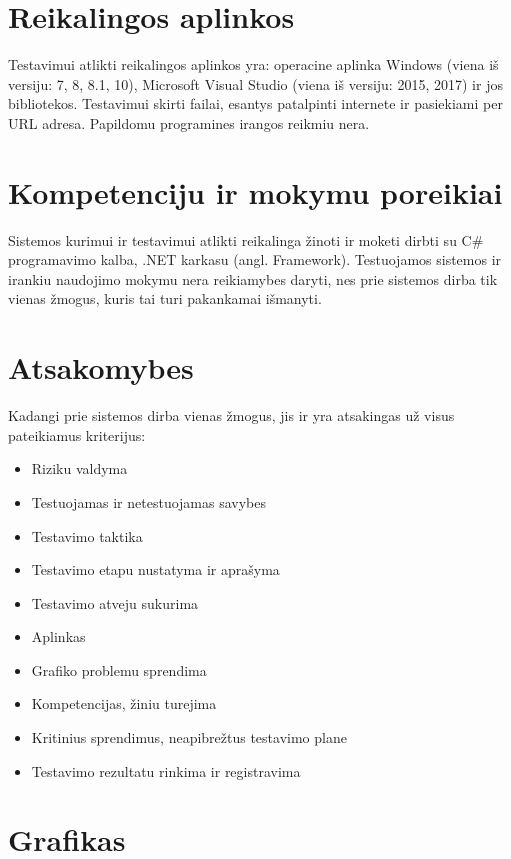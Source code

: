 \documentclass{VUMIFPSkursinis}
\begin{document}
\section{Reikalingos aplinkos}

Testavimui atlikti reikalingos aplinkos yra: operacine aplinka Windows (viena iš versiju: 7, 8, 8.1, 10), Microsoft Visual Studio (viena iš versiju: 2015, 2017) ir jos bibliotekos. 
Testavimui skirti failai, esantys patalpinti internete ir pasiekiami per URL adresa. 
Papildomu programines irangos reikmiu nera.

\section{Kompetenciju ir mokymu poreikiai}

Sistemos kurimui ir testavimui atlikti reikalinga žinoti ir moketi dirbti su C\# programavimo kalba, .NET karkasu (angl. Framework). 
Testuojamos sistemos ir irankiu naudojimo mokymu nera reikiamybes daryti, nes prie sistemos dirba tik vienas žmogus, kuris tai turi pakankamai išmanyti.

\section{Atsakomybes}

Kadangi prie sistemos dirba vienas žmogus, jis ir yra atsakingas už visus pateikiamus kriterijus: 

\begin{itemize}
	\item Riziku valdyma
	\item Testuojamas ir netestuojamas savybes
	\item Testavimo taktika
	\item Testavimo etapu nustatyma ir aprašyma
	\item Testavimo atveju sukurima
	\item Aplinkas
	\item Grafiko problemu sprendima
	\item Kompetencijas, žiniu turejima
	\item Kritinius sprendimus, neapibrežtus testavimo plane
	\item Testavimo rezultatu rinkima ir registravima
\end{itemize}

\section{Grafikas}
\end{document}
